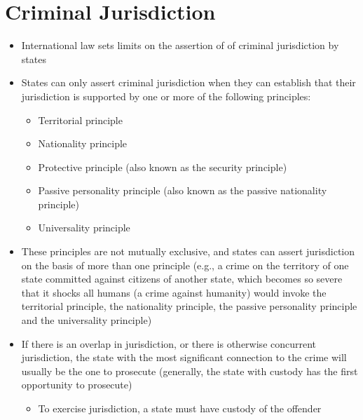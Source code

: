 \section{Criminal Jurisdiction}
\begin{itemize}
    \item International law sets limits on the assertion of of criminal jurisdiction by states
    \item States can only assert criminal jurisdiction when they can establish that their jurisdiction is supported by one or more of the following principles:
    \begin{itemize}
        \item Territorial principle
        \item Nationality principle
        \item Protective principle (also known as the security principle)
        \item Passive personality principle (also known as the passive nationality principle)
        \item Universality principle
    \end{itemize}
    \item These principles are not mutually exclusive, and states can assert jurisdiction on the basis of more than one principle (e.g., a crime on the territory of one state committed against citizens of another state, which becomes so severe that it shocks all humans (a crime against humanity) would invoke the territorial principle, the nationality principle, the passive personality principle and the universality principle)
    \item If there is an overlap in jurisdiction, or there is otherwise concurrent jurisdiction, the state with the most significant connection to the crime will usually be the one to prosecute (generally, the state with custody has the first opportunity to prosecute)
    \begin{itemize}
        \item To exercise jurisdiction, a state must have custody of the offender
    \end{itemize}
\end{itemize}

